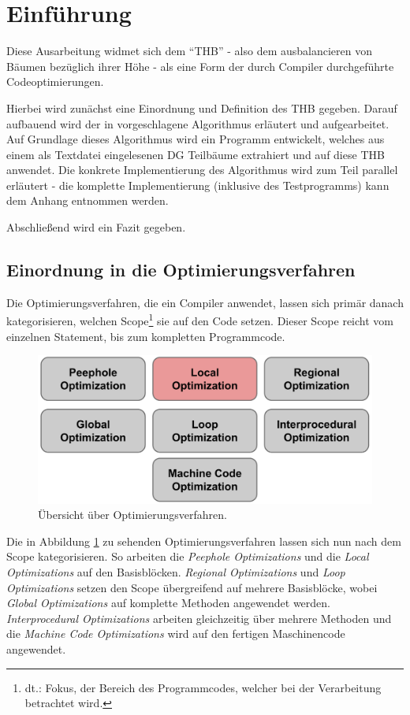 \chapter{Einführung}
\label{Einfuehrung}
Diese Ausarbeitung widmet sich dem \enquote{\ac{THB}} - also dem ausbalancieren von Bäumen bezüglich ihrer Höhe - als eine Form der durch Compiler durchgeführte Codeoptimierungen.

Hierbei wird zunächst eine Einordnung und Definition des \ac{THB} gegeben. Darauf aufbauend wird der in \cite{HeBIS-309344573} vorgeschlagene Algorithmus erläutert und aufgearbeitet. Auf Grundlage dieses Algorithmus wird ein Programm entwickelt, welches aus einem als Textdatei eingelesenen \ac{DG} Teilbäume extrahiert und auf diese \ac{THB} anwendet. Die konkrete Implementierung des Algorithmus wird zum Teil parallel erläutert - die komplette Implementierung (inklusive des Testprogramms) kann dem Anhang entnommen werden.

Abschließend wird ein Fazit gegeben.


\section{Einordnung in die Optimierungsverfahren}

Die Optimierungsverfahren, die ein Compiler anwendet, lassen sich primär danach kategorisieren, welchen Scope\footnote{dt.: Fokus, der Bereich des Programmcodes, welcher bei der Verarbeitung betrachtet wird.} sie auf den Code setzen. Dieser Scope reicht vom einzelnen Statement, bis zum kompletten Programmcode.

\begin{figure}[h]
	\centering
	\includegraphics[scale=0.5]{images/Einordnung.png}
	\caption{Übersicht über Optimierungsverfahren.}
	\label{fig:Einordnung}
\end{figure}

Die in Abbildung \ref{Einfuehrung} zu sehenden Optimierungsverfahren lassen sich nun nach dem Scope kategorisieren. So arbeiten die \textit{Peephole Optimizations} und die \textit{Local Optimizations} auf den Basisblöcken. \textit{Regional Optimizations} und \textit{Loop Optimizations} setzen den Scope übergreifend auf mehrere Basisblöcke, wobei \textit{Global Optimizations} auf komplette Methoden angewendet werden. \textit{Interprocedural Optimizations} arbeiten gleichzeitig über mehrere Methoden und die \textit{Machine Code Optimizations} wird auf den fertigen Maschinencode angewendet.

